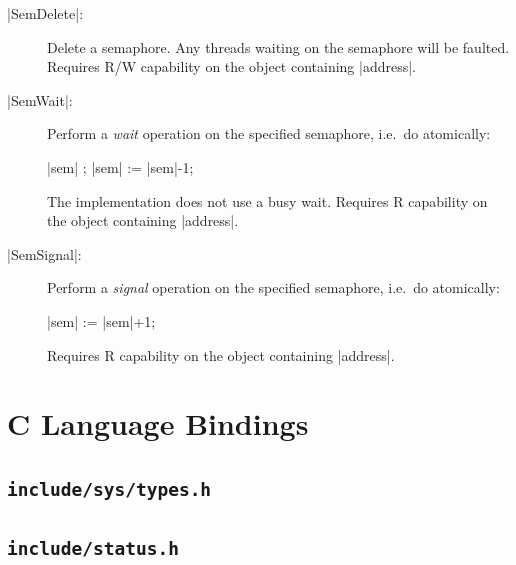 \documentclass[a4paper,11pt,twoside,dvips]{report}
\begin{document}
\begin{description}
\item[|SemDelete|:] Delete a semaphore. Any threads waiting on the
semaphore will be faulted. Requires R/W capability on the object
containing |address|.

\item[|SemWait|:] Perform a \emph{wait} operation on the specified
semaphore, i.e.\ do atomically:
\begin{center}
\begin{programbox}
\WHILE |sem|  \DO \OD;
|sem| := |sem|-1;
\end{programbox}
\end{center}
The implementation does not use a busy wait. Requires R capability on
the object containing |address|.

\item[|SemSignal|:] Perform a \emph{signal} operation on the specified
semaphore, i.e.\ do atomically:
\begin{center}
\begin{programbox}
|sem| := |sem|+1;
\end{programbox}
\end{center}
Requires R capability on the object containing |address|.
\end{description}






\cleardoublepage

\sloppy




\cleardoublepage

\appendix

\chapter{\label{s:h}C Language Bindings}
\section{\label{s:types.h}\texttt{include/sys/types.h}}
{\small}

\newpage
\section{\label{s:status.h}\texttt{include/status.h}}
{\small}
\end{document}
